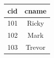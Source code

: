 \begin{tabular}{|c|c|}
\hline
cid & cname \\ \hline
101 & Ricky \\
102 & Mark \\
103 & Trevor \\ \hline
\end{tabular}
